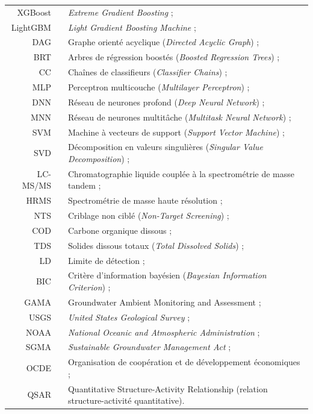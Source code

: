 \begin{longtable}{rp{5mm}p{12cm}}
		XGBoost & & \emph{Extreme Gradient Boosting} ; \\
		LightGBM & & \emph{Light Gradient Boosting Machine} ; \\
		DAG & & Graphe orient\'e acyclique (\emph{Directed Acyclic Graph}) ; \\
		BRT & & Arbres de r\'egression boost\'es (\emph{Boosted Regression Trees}) ; \\
		CC & & Cha\^ines de classifieurs (\emph{Classifier Chains}) ; \\
		MLP & & Perceptron multicouche (\emph{Multilayer Perceptron}) ; \\
		DNN & & R\'eseau de neurones profond (\emph{Deep Neural Network}) ; \\
		MNN & & R\'eseau de neurones multit\^ache (\emph{Multitask Neural Network}) ; \\
		SVM & & Machine \`a vecteurs de support (\emph{Support Vector Machine}) ; \\
		SVD & & D\'ecomposition en valeurs singuli\`eres (\emph{Singular Value Decomposition}) ; \\
		LC-MS/MS & & Chromatographie liquide coupl\'ee \`a la spectrom\'etrie de masse tandem ; \\
		HRMS & & Spectrom\'etrie de masse haute r\'esolution ; \\
		NTS & & Criblage non cibl\'e (\emph{Non-Target Screening}) ; \\
		COD & & Carbone organique dissous ; \\
		TDS & & Solides dissous totaux (\emph{Total Dissolved Solids}) ; \\
		LD & & Limite de d\'etection ; \\
		BIC & & Crit\`ere d'information bay\'esien (\emph{Bayesian Information Criterion}) ; \\
		GAMA & & Groundwater Ambient Monitoring and Assessment ; \\
		USGS & & \emph{United States Geological Survey} ; \\
		NOAA & & \emph{National Oceanic and Atmospheric Administration} ; \\
		SGMA & & \emph{Sustainable Groundwater Management Act} ; \\
		OCDE & & Organisation de coop\'eration et de d\'eveloppement \'economiques ; \\
		QSAR & & Quantitative Structure-Activity Relationship (relation structure-activit\'e quantitative).
\end{longtable}
